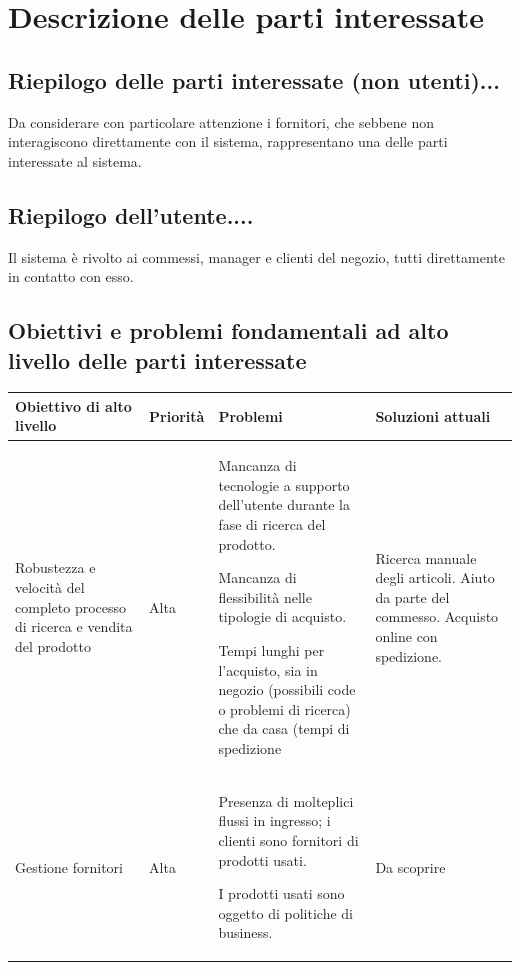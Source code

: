 \documentclass[a4paper,10pt]{report}
\begin{document}
  \section*{Descrizione delle parti interessate}
  
  \subsection*{Riepilogo delle parti interessate (non utenti)...}
  Da considerare con particolare attenzione i fornitori, che sebbene non interagiscono
direttamente con il sistema, rappresentano una delle parti interessate al sistema.
  
  \subsection*{Riepilogo dell'utente....}
  Il sistema è rivolto ai commessi, manager e clienti del negozio, tutti direttamente in
contatto con esso.
  
  \subsection*{Obiettivi e problemi fondamentali ad alto livello delle parti interessate}
  \begin{tabular}{|p{} p{} p{} p{}|}
      \hline
      \textbf{Obiettivo di alto livello} & \textbf{Priorit\`a} & \textbf{Problemi} & \textbf{Soluzioni attuali}\\
      \hline
      Robustezza e
velocità del
completo
processo di
ricerca e vendita
del prodotto & 
Alta &  
Mancanza di
tecnologie a
supporto
dell'utente durante
la fase di ricerca
del prodotto.

Mancanza di
flessibilità nelle
tipologie di
acquisto.

Tempi lunghi per
l'acquisto, sia in
negozio (possibili
code o problemi di
ricerca) che da
casa (tempi di
spedizione
& 
Ricerca manuale
degli articoli.
Aiuto da parte del
commesso.
Acquisto online
con spedizione.\\
      \hline
Gestione fornitori &
Alta &
Presenza di
molteplici flussi in
ingresso; i clienti
sono fornitori di
prodotti usati.

I prodotti usati
sono oggetto di
politiche di
business. &
Da scoprire \\
\hline


      \end{tabular}
  
\end{document}

